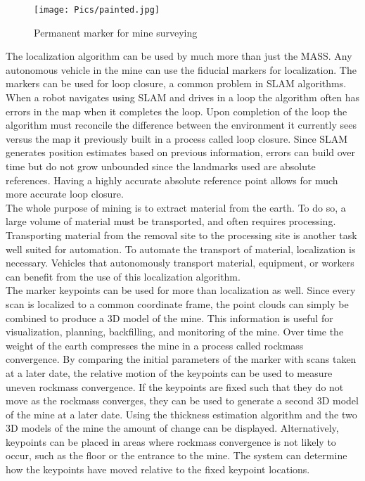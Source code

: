 \begin{figure}
    \centering
\texttt{[image: Pics/painted.jpg]} 
    \caption{Permanent marker for mine surveying}
    \label{fig:minepaint}
\end{figure}

The localization algorithm can be used by much more than just the MASS. Any autonomous vehicle in the mine can use the fiducial markers for localization. The markers can be used for loop closure, a common problem in SLAM algorithms. When a robot navigates using SLAM and drives in a loop the algorithm often has errors in the map when it completes the loop. Upon completion of the loop the algorithm must reconcile the difference between the environment it currently sees versus the map it previously built in a process called loop closure. Since SLAM generates position estimates based on previous information, errors can build over time but do not grow unbounded since the landmarks used are absolute references. Having a highly accurate absolute reference point allows for much more accurate loop closure.\\

The whole purpose of mining is to extract material from the earth. To do so, a large volume of material must be transported, and often requires processing. Transporting material from the removal site to the processing site is another task well suited for automation. To automate the transport of material, localization is necessary. Vehicles that autonomously transport material, equipment, or workers can benefit from the use of this localization algorithm.\\

The marker keypoints can be used for more than localization as well. Since every scan is localized to a common coordinate frame, the point clouds can simply be combined to produce a 3D model of the mine. This information is useful for visualization, planning, backfilling, and monitoring of the mine. Over time the weight of the earth compresses the mine in a process called rockmass convergence. By comparing the initial parameters of the marker with scans taken at a later date, the relative motion of the keypoints can be used to measure uneven rockmass convergence. If the keypoints are fixed such that they do not move as the rockmass converges, they can be used to generate a second 3D model of the mine at a later date. Using the thickness estimation algorithm and the two 3D models of the mine the amount of change can be displayed. Alternatively, keypoints can be placed in areas where rockmass convergence is not likely to occur, such as the floor or the entrance to the mine. The system can determine how the keypoints have moved relative to the fixed keypoint locations.\\


